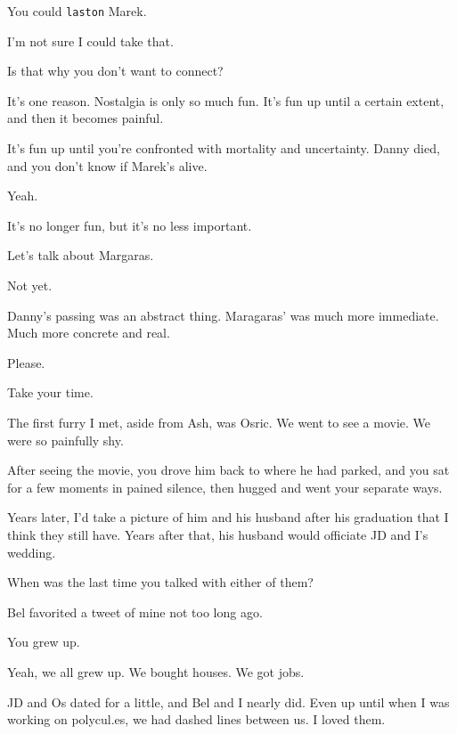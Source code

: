 \begin{paracol}{2}
\begin{leftcolumn}
\begin{ally}
You could \texttt{laston} Marek.
\end{ally}
I'm not sure I could take that.

\begin{ally}
Is that why you don't want to connect?
\end{ally}
It's one reason. Nostalgia is only so much fun. It's fun up until a certain extent, and then it becomes painful.

\begin{ally}
It's fun up until you're confronted with mortality and uncertainty. Danny died, and you don't know if Marek's alive.
\end{ally}
Yeah.

It's no longer fun, but it's no less important.

\begin{ally}
Let's talk about Margaras.
\end{ally}
Not yet.

\begin{ally}
Danny's passing was an abstract thing. Maragaras' was much more immediate. Much more concrete and real.
\end{ally}
Please.

\begin{ally}
Take your time.
\end{ally}
\newpage

\noindent The first furry I met, aside from Ash, was Osric. We went to see a movie. We were so painfully shy.

\begin{ally}
After seeing the movie, you drove him back to where he had parked, and you sat for a few moments in pained silence, then hugged and went your separate ways.
\end{ally}
Years later, I'd take a picture of him and his husband after his graduation that I think they still have. Years after that, his husband would officiate JD and I's wedding.

\begin{ally}
When was the last time you talked with either of them?
\end{ally}
Bel favorited a tweet of mine not too long ago.

\begin{ally}
You grew up.
\end{ally}
Yeah, we all grew up. We bought houses. We got jobs.

JD and Os dated for a little, and Bel and I nearly did. Even up until when I was working on polycul.es, we had dashed lines between us. I loved them.


\end{leftcolumn}
\end{paracol}
